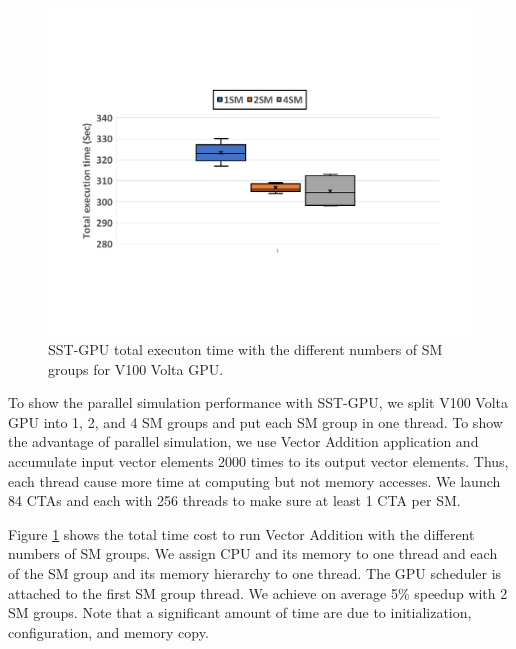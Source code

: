    \begin{figure}[!htb]
      \centering
      \setlength{\abovecaptionskip}{6pt plus 1pt minus 1pt}
      \includegraphics[width=.90\textwidth,keepaspectratio]{figures/par-perf.pdf}
      \captionsetup{width=.90\textwidth}
      \caption{SST-GPU total executon time with the different numbers of SM groups for V100 Volta GPU.}
      \label{fig:par-perf}
   \end{figure}

To show the parallel simulation performance with SST-GPU, we split V100 Volta GPU
into 1, 2, and 4 SM groups and put each SM group in one thread. To show the advantage
of parallel simulation, we use Vector Addition application and accumulate input vector elements
2000 times to its output vector elements. Thus, each thread cause more time at computing
but not memory accesses. We launch 84 CTAs and each with 256 threads to make sure at least
1 CTA per SM.

Figure \ref{fig:par-perf} shows the total time cost to run Vector Addition
with the different numbers of SM groups. We assign CPU and its memory to one thread and
each of the SM group and its memory hierarchy to one thread. The GPU scheduler is attached
to the first SM group thread. We achieve on average 5\% speedup with 2 SM groups. Note that
a significant amount of time are due to initialization, configuration, and memory copy.
